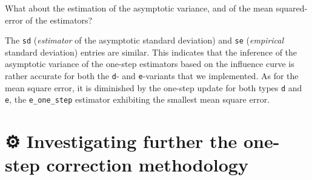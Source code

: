 \documentclass[11pt,openright,twoside]{book}
\newenvironment{Shaded}{\begin{snugshade}}{\end{snugshade}}
\newcommand{\CommentTok}[1]{\textcolor[rgb]{0.56,0.35,0.01}{\textit{#1}}}
\newcommand{\DataTypeTok}[1]{\textcolor[rgb]{0.13,0.29,0.53}{#1}}
\newcommand{\DecValTok}[1]{\textcolor[rgb]{0.00,0.00,0.81}{#1}}
\newcommand{\KeywordTok}[1]{\textcolor[rgb]{0.13,0.29,0.53}{\textbf{#1}}}
\newcommand{\NormalTok}[1]{#1}
\newcommand{\OperatorTok}[1]{\textcolor[rgb]{0.81,0.36,0.00}{\textbf{#1}}}
\newcommand{\StringTok}[1]{\textcolor[rgb]{0.31,0.60,0.02}{#1}}
\newcommand{\gear}{\usebox{\gearbox}\;}
\theoremstyle{definition}
\theoremstyle{definition}
\theoremstyle{definition}
\theoremstyle{remark}
\begin{document}
What about the estimation of the asymptotic variance, and of the mean squared-error of the estimators?

\begin{Shaded}
\end{Shaded}

The \texttt{sd} (\emph{estimator} of the asymptotic standard deviation) and \texttt{se}
(\emph{empirical} standard deviation) entries are similar. This indicates that the
inference of the asymptotic variance of the one-step estimators based on the
influence curve is rather accurate for both the \texttt{d}- and \texttt{e}-variants that we
implemented. As for the mean square error, it is diminished by the one-step
update for both types \texttt{d} and \texttt{e}, the \texttt{e\_one\_step} estimator exhibiting the
smallest mean square error.

\hypertarget{exo-one-step}{%
\section{\texorpdfstring{⚙ \gear Investigating further the one-step correction methodology}{⚙ Investigating further the one-step correction methodology}}\label{exo-one-step}}
\end{document}
